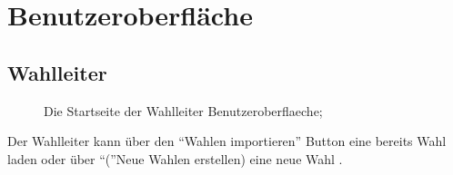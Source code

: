 \documentclass[parskip=full,11pt,twoside]{scrartcl}
\begin{document}
\section{Benutzeroberfläche}

\subsection{Wahlleiter}

\begin{figure}[H]
	\caption{\label{fig:wlltr-start}
		Die Startseite der \gls{Wahlleiter} \gls{Benutzeroberflaeche};
	}
\end{figure}
Der \gls{Wahlleiter} kann über den \enquote{Wahlen importieren} Button eine bereits  \gls{Wahl} laden oder über \enquote(Neue Wahlen erstellen) eine neue \gls{Wahl} . 
\end{document}
